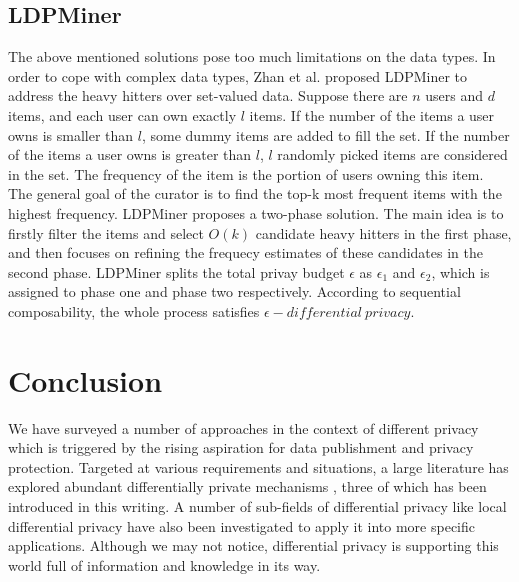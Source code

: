 \documentclass[a4paper, 11pt]{article} %
\begin{document}
\subsection{LDPMiner}
The above mentioned solutions pose too much limitations on the data types. In order to cope with complex data types, Zhan et al. proposed LDPMiner\cite{qin2016heavy} to address the heavy hitters over set-valued data. Suppose there are $n$ users and $d$ items, and each user can own exactly $l$ items. If the number of the items a user owns is smaller than $l$, some dummy items are added to fill the set. If the number of the items a user owns is greater than $l$, $l$ randomly picked items are considered in the set. The frequency of the item is the portion of users owning this item. The general goal of the curator is to find the top-k most frequent items with the highest frequency. LDPMiner proposes a two-phase solution. The main idea is to firstly filter the items and select $O(k)$ candidate heavy hitters in the first phase, and then focuses on refining the frequecy estimates of these candidates in the second phase. LDPMiner splits the total privay budget $\epsilon$ as $\epsilon_1$ and $\epsilon_2$, which is assigned to phase one and phase two respectively. According to sequential composability\cite{mcsherry2009privacy}, the whole process satisfies $\epsilon - differential \ privacy$.

\section*{Conclusion}
We have surveyed a number of approaches in the context of different privacy which is triggered by the rising aspiration for data publishment and privacy protection. Targeted at various requirements and situations, a large literature has explored abundant differentially private mechanisms \cite{mcsherry2007mechanism}, three of which has been introduced in this writing. A number of sub-fields of differential privacy like local differential privacy have also been investigated to apply it into more specific applications. Although we may not notice, differential privacy is supporting this world full of information and knowledge in its way.









\end{document}
